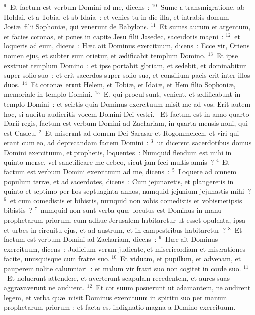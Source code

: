 ${}^{9}$~Et factum est verbum Domini ad me, dicens~:
${}^{10}$~Sume a transmigratione, ab Holdai, et a Tobia, et ab Idaia~: et venies tu in die illa, et intrabis domum Josi\ae\ filii Sophoni\ae , qui venerunt de Babylone.
${}^{11}$~Et sumes aurum et argentum, et facies coronas, et pones in capite Jesu filii Josedec, sacerdotis magni~:
${}^{12}$~et loqueris ad eum, dicens~: H\ae c ait Dominus exercituum, dicens~: Ecce vir, Oriens nomen ejus, et subter eum orietur, et \ae dificabit templum Domino.
${}^{13}$~Et ipse exstruet templum Domino~: et ipse portabit gloriam, et sedebit, et dominabitur super solio suo~: et erit sacerdos super solio suo, et consilium pacis erit inter illos duos.
${}^{14}$~Et coron\ae\ erunt Helem, et Tobi\ae , et Idai\ae , et Hem filio Sophoni\ae , memoriale in templo Domini.
${}^{15}$~Et qui procul sunt, venient, et \ae dificabunt in templo Domini~: et scietis quia Dominus exercituum misit me ad vos. Erit autem hoc, si auditu audieritis vocem Domini Dei vestri.
~\lettrine[lines=10,image=true,loversize=0.05,lraise=-0.03]{E}{}t factum est in anno quarto Darii regis, factum est verbum Domini ad Zachariam, in quarta mensis noni, qui est Casleu.
${}^{2}$~Et miserunt ad domum Dei Sarasar et Rogommelech, et viri qui erant cum eo, ad deprecandam faciem Domini~:
${}^{3}$~ut dicerent sacerdotibus domus Domini exercituum, et prophetis, loquentes~: Numquid flendum est mihi in quinto mense, vel sanctificare me debeo, sicut jam feci multis annis~?
${}^{4}$~Et factum est verbum Domini exercituum ad me, dicens~:
${}^{5}$~Loquere ad omnem populum terr\ae , et ad sacerdotes, dicens~: Cum jejunaretis, et plangeretis in quinto et septimo per hos septuaginta annos, numquid jejunium jejunastis mihi~?
${}^{6}$~et cum comedistis et bibistis, numquid non vobis comedistis et vobismetipsis bibistis~?
${}^{7}$~numquid non sunt verba qu\ae\ locutus est Dominus in manu prophetarum priorum, cum adhuc Jerusalem habitaretur ut esset opulenta, ipsa et urbes in circuitu ejus, et ad austrum, et in campestribus habitaretur~?
${}^{8}$~Et factum est verbum Domini ad Zachariam, dicens~:
${}^{9}$~H\ae c ait Dominus exercituum, dicens~: Judicium verum judicate, et misericordiam et miserationes facite, unusquisque cum fratre suo.
${}^{10}$~Et viduam, et pupillum, et advenam, et pauperem nolite calumniari~: et malum vir fratri suo non cogitet in corde suo.
${}^{11}$~Et noluerunt attendere, et averterunt scapulam recedentem, et aures suas aggravaverunt ne audirent.
${}^{12}$~Et cor suum posuerunt ut adamantem, ne audirent legem, et verba qu\ae\ misit Dominus exercituum in spiritu suo per manum prophetarum priorum~: et facta est indignatio magna a Domino exercituum.
